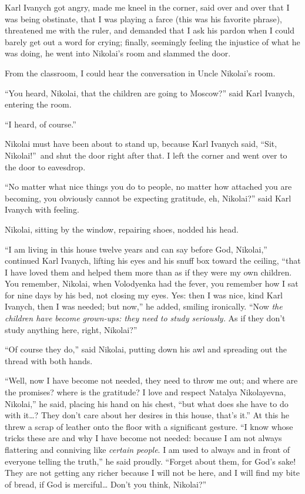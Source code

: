 Karl Ivanych got angry, made me kneel in the corner, said over and over that I was being obstinate, that I was playing a farce (this was his favorite phrase), threatened me with the ruler, and demanded that I ask his pardon when I could barely get out a word for crying; finally, seemingly feeling the injustice of what he was doing, he went into Nikolai's room and slammed the door.

From the classroom, I could hear the conversation in Uncle Nikolai's room.

``You heard, Nikolai, that the children are going to Moscow?'' said Karl Ivanych, entering the room. %

``I heard, of course.'' %

Nikolai must have been about to stand up, because Karl Ivanych said, ``Sit, Nikolai!''~and shut the door right after that. I left the corner and went over to the door to eavesdrop.

``No matter what nice things you do to people, no matter how attached you are becoming, you obviously cannot be expecting gratitude, eh, Nikolai?'' said Karl Ivanych with feeling. %

Nikolai, sitting by the window, repairing shoes, nodded his head.

``I am living in this house twelve years and can say before God, Nikolai,'' continued Karl Ivanych, lifting his eyes and his snuff box toward the ceiling, ``that I have loved them and helped them more than as if they were my own children. You remember, Nikolai, when Volodyenka had the fever, you remember how I sat for nine days by his bed, not closing my eyes. Yes: then I was nice, kind Karl Ivanych, then I was needed; but now,'' he added, smiling ironically. ``Now \emph{the children have become grown-ups: they need to study seriously.} As if they don't study anything here, right, Nikolai?'' %

``Of course they do,'' said Nikolai, putting down his awl and spreading out the thread with both hands. %

``Well, now I have become not needed, they need to throw me out; and where are the promises? where is the gratitude? I love and respect Natalya Nikolayevna, Nikolai,'' he said, placing his hand on his chest, ``but what does she have to do with it\ldots{}? They don't care about her desires in this house, that's it.'' At this he threw a scrap of leather onto the floor with a significant gesture. ``I know whose tricks these are and why I have become not needed: because I am not always flattering and conniving like \emph{certain people}. I am used to always and in front of everyone telling the truth,'' he said proudly. ``Forget about them, for God's sake! They are not getting any richer because I will not be here, and I will find my bite of bread, if God is merciful\ldots{} Don't you think, Nikolai?'' %

